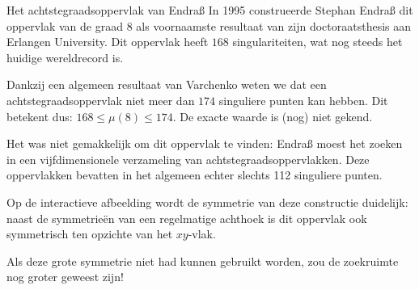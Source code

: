 \begin{surferPage}[Endraß]{Het achtstegraadsoppervlak van Endraß}
     In 1995 construeerde Stephan Endraß dit oppervlak van de graad $8$ als voornaamste resultaat van zijn doctoraatsthesis aan Erlangen University.
    Dit oppervlak heeft $168$ singulariteiten, wat nog steeds het huidige wereldrecord is. 
  
     Dankzij een algemeen resultaat van Varchenko weten we dat een achtstegraadsoppervlak niet meer dan $174$ singuliere punten kan hebben. Dit betekent dus: $168 \leqslant \mu(8) \leqslant 174$. 
    De exacte waarde is (nog) niet gekend.

     Het was niet gemakkelijk om dit oppervlak te vinden: Endraß moest het zoeken in een vijfdimensionele verzameling van achtstegraadsoppervlakken. Deze oppervlakken bevatten in het algemeen echter slechts 112 singuliere punten.

    Op de interactieve afbeelding wordt de symmetrie van deze constructie duidelijk: 
    naast de symmetrie\"en van een regelmatige achthoek is dit oppervlak ook symmetrisch ten opzichte van het $xy$-vlak.

    Als deze grote symmetrie niet had kunnen gebruikt worden, zou de zoekruimte nog groter geweest zijn!
\end{surferPage}
